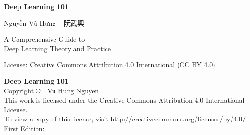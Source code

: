\documentclass[10pt,\papersize,twoside,openright]{book}
\theoremstyle{definition}
\theoremstyle{remark}
\begin{document}
\begin{titlepage}
\thispagestyle{empty}
\centering
\vspace*{\fill}

{\Huge\bfseries Deep Learning 101\par}
\vspace{2cm}

{\Large Nguyễn Vũ Hưng -- 阮武興 \par}
\vspace{2cm}

{\large A Comprehensive Guide to\\
Deep Learning Theory and Practice\par}

\vspace{3cm}

{\large \DTMtoday\par}
\vspace{1cm}

{\small License: Creative Commons Attribution 4.0 International (CC BY 4.0)\par}

\vspace*{\fill}
\end{titlepage}

\newpage
\thispagestyle{empty}
\vspace*{\fill}
\begin{flushleft}
\textbf{Deep Learning 101}\\
Copyright \copyright~\the\year~Vu Hung Nguyen\\[0.5em]
This work is licensed under the Creative Commons Attribution 4.0 International License.\\
To view a copy of this license, visit \url{http://creativecommons.org/licenses/by/4.0/}\\[0.5em]
First Edition: \DTMtoday
\end{flushleft}
\vspace*{\fill}
\clearpage
\end{document}
